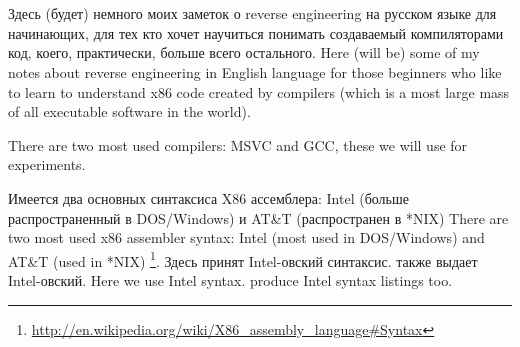 ﻿%

\chapter{}

\IFRU
{Здесь (будет) немного моих заметок о reverse engineering на русском языке для начинающих, 
для тех кто хочет научиться понимать создаваемый \CCpp компиляторами код, коего, 
практически, больше всего остального.}
{Here (will be) some of my notes about reverse engineering in English language for 
those beginners who like to learn to understand x86 code created by \CCpp compilers 
(which is a most large mass of all executable software in the world).}

{There are two most used compilers: MSVC and GCC, these we will use for experiments.}

\IFRU
{Имеется два основных синтаксиса X86 ассемблера: Intel (больше распространенный в DOS/Windows) и 
AT\&T (распространен в *NIX)}
{There are two most used x86 assembler syntax: Intel (most used in DOS/Windows) and AT\&T (used in *NIX)}
\footnote{\url{http://en.wikipedia.org/wiki/X86_assembly_language\#Syntax}}. 
\IFRU
{Здесь принят Intel-овский синтаксис. \IDA также выдает Intel-овский.}
{Here we use Intel syntax. \IDA produce Intel syntax listings too.}
